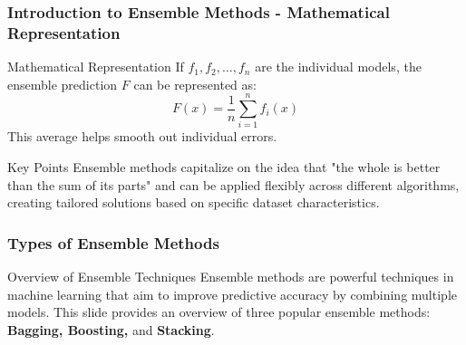 \documentclass[aspectratio=169]{beamer}
\begin{document}
\begin{frame}[fragile]
  \frametitle{Introduction to Ensemble Methods - Mathematical Representation}
  \begin{block}{Mathematical Representation}
    If \( f_1, f_2, \ldots, f_n \) are the individual models, the ensemble prediction \( F \) can be represented as:
    \begin{equation}
      F(x) = \frac{1}{n} \sum_{i=1}^{n} f_i(x)
    \end{equation}
    This average helps smooth out individual errors.
  \end{block}
  
  \begin{block}{Key Points}
    Ensemble methods capitalize on the idea that "the whole is better than the sum of its parts" and can be applied flexibly across different algorithms, creating tailored solutions based on specific dataset characteristics.
  \end{block}
\end{frame}

\begin{frame}
    \frametitle{Types of Ensemble Methods}
    \begin{block}{Overview of Ensemble Techniques}
        Ensemble methods are powerful techniques in machine learning that aim to improve predictive accuracy by combining multiple models. This slide provides an overview of three popular ensemble methods: \textbf{Bagging, Boosting,} and \textbf{Stacking}.
    \end{block}
\end{frame}
\end{document}

